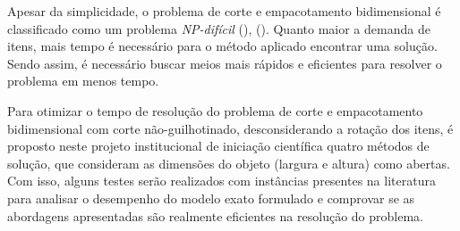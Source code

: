     Apesar da simplicidade, o problema de corte e empacotamento bidimensional é classificado como um problema \emph{NP-difícil} (\cite{Garey1990}), (\cite{Lodi2002}). Quanto maior a demanda de itens, mais tempo é necessário para o método aplicado encontrar uma solução. Sendo assim, %
    é necessário buscar meios mais rápidos e eficientes para resolver o problema em menos tempo.

    Para otimizar o tempo de resolução do problema de corte e empacotamento bidimensional com corte não-guilhotinado, desconsiderando a rotação dos itens, é proposto neste projeto institucional de iniciação científica quatro métodos de solução, que consideram as dimensões do objeto (largura e altura) como abertas. Com isso, alguns testes serão realizados com instâncias presentes na literatura para analisar o desempenho do modelo exato formulado e comprovar se as abordagens apresentadas são realmente eficientes na resolução do problema.
